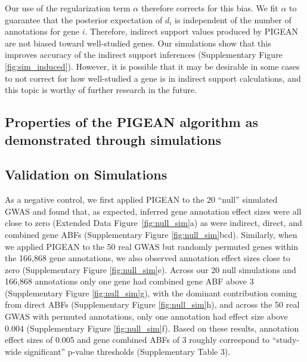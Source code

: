 {Our use of the regularization term $\alpha$ therefore corrects for
this bias. We fit $\alpha$ to guarantee that the posterior expectation
of $d_i$ is independent of the number of annotations for gene
$i$. Therefore, indirect support values produced by PIGEAN are not
biased toward well-studied genes. Our
simulations show that this improves accuracy of the indirect support
inferences (Supplementary Figure \ref{fig:sim_induced}). 
However, it is possible that it may be desirable in some cases to not correct for
how well-studied a gene is in indirect support calculations, and this
topic is worthy of further research in the future.

\subsection{Properties of the PIGEAN algorithm as demonstrated through
  simulations}

\subsection{Validation on Simulations}\label{sec:simval}
As a negative control, we first applied PIGEAN to the 20 “null” simulated GWAS and found that, as expected, inferred gene annotation effect sizes were all close to zero (Extended Data Figure~\ref{fig:null_sim}a) as were indirect, direct, and combined gene ABFs (Supplementary Figure \ref{fig:null_sim}bcd). Similarly, when we applied PIGEAN to the 50 real GWAS but randomly permuted genes within the 166,868 gene annotations, we also observed annotation effect sizes close to zero (Supplementary  Figure \ref{fig:null_sim}e). Across our 20 null simulations and 166,868 annotations only one gene had combined gene ABF above 3 (Supplementary Figure \ref{fig:null_sim}g), with the dominant contribution coming from direct ABFs (Supplementary Figure \ref{fig:null_sim}h), and across the 50 real GWAS with permuted annotations, only one annotation had effect size above 0.004 (Supplementary Figure \ref{fig:null_sim}f). Based on these results, annotation effect sizes of 0.005 and gene combined ABFs of 3 roughly correspond to “study-wide significant” p-value thresholds (Supplementary Table 3).

}
